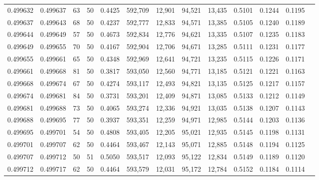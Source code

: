 \begin{tabular}{rrrrrrrrrrrrr}
0.499632 & 0.499637 &    63 &  50 &                                     0.4425 & 592,709 &  12,901 &  94,521 &  13,435 & 0.5101 & 0.1244 & 0.1195 \\
0.499637 & 0.499643 &    68 &  50 &                                     0.4237 & 592,777 &  12,833 &  94,571 &  13,385 & 0.5105 & 0.1240 & 0.1189 \\
0.499644 & 0.499649 &    57 &  50 &                                     0.4673 & 592,834 &  12,776 &  94,621 &  13,335 & 0.5107 & 0.1235 & 0.1183 \\
0.499649 & 0.499655 &    70 &  50 &                                     0.4167 & 592,904 &  12,706 &  94,671 &  13,285 & 0.5111 & 0.1231 & 0.1177 \\
0.499655 & 0.499661 &    65 &  50 &                                     0.4348 & 592,969 &  12,641 &  94,721 &  13,235 & 0.5115 & 0.1226 & 0.1171 \\
0.499661 & 0.499668 &    81 &  50 &                                     0.3817 & 593,050 &  12,560 &  94,771 &  13,185 & 0.5121 & 0.1221 & 0.1163 \\
0.499668 & 0.499674 &    67 &  50 &                                     0.4274 & 593,117 &  12,493 &  94,821 &  13,135 & 0.5125 & 0.1217 & 0.1157 \\
0.499674 & 0.499681 &    84 &  50 &                                     0.3731 & 593,201 &  12,409 &  94,871 &  13,085 & 0.5133 & 0.1212 & 0.1149 \\
0.499681 & 0.499688 &    73 &  50 &                                     0.4065 & 593,274 &  12,336 &  94,921 &  13,035 & 0.5138 & 0.1207 & 0.1143 \\
0.499688 & 0.499695 &    77 &  50 &                                     0.3937 & 593,351 &  12,259 &  94,971 &  12,985 & 0.5144 & 0.1203 & 0.1136 \\
0.499695 & 0.499701 &    54 &  50 &                                     0.4808 & 593,405 &  12,205 &  95,021 &  12,935 & 0.5145 & 0.1198 & 0.1131 \\
0.499701 & 0.499707 &    62 &  50 &                                     0.4464 & 593,467 &  12,143 &  95,071 &  12,885 & 0.5148 & 0.1194 & 0.1125 \\
0.499707 & 0.499712 &    50 &  51 &                                     0.5050 & 593,517 &  12,093 &  95,122 &  12,834 & 0.5149 & 0.1189 & 0.1120 \\
0.499712 & 0.499717 &    62 &  50 &                                     0.4464 & 593,579 &  12,031 &  95,172 &  12,784 & 0.5152 & 0.1184 & 0.1114 \\

\end{tabular}
